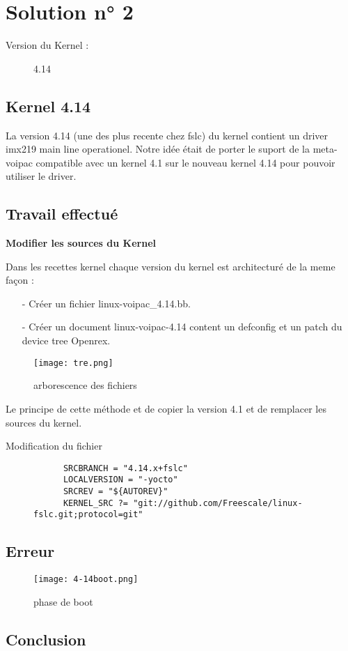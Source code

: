 
\chapter{Solution n° 2} %

\label{Chapter3} %
\begin{description}
  \item[Version du Kernel :] 4.14
\end{description}

\section{Kernel 4.14}
La version 4.14 (une des plus recente chez fslc) du kernel contient un driver imx219
main line operationel. Notre idée était de porter le suport de la meta-voipac compatible
avec un kernel 4.1 sur le nouveau kernel 4.14 pour pouvoir utiliser le driver.

\section{Travail effectué}
\textbf{Modifier les sources du Kernel}

 Dans les recettes kernel chaque version du kernel est architecturé de la meme façon :
  \begin{itemize}
  \item[-] Créer un fichier linux-voipac\_4.14.bb.
  \item[-] Créer un document linux-voipac-4.14 content un defconfig et un patch du device tree Openrex.
  \end{itemize}

\begin{figure}[th]
  \centering
  \texttt{[image: tre.png]}
  \decoRule
  \caption{arborescence des fichiers}  \label{fig:planning}
\end{figure}

Le principe de cette méthode et de copier la version 4.1 et de remplacer les sources du kernel. 

\begin{description}
  \item[Modification du fichier]
    \begin{lstlisting}
      SRCBRANCH = "4.14.x+fslc"
      LOCALVERSION = "-yocto"
      SRCREV = "${AUTOREV}"
      KERNEL_SRC ?= "git://github.com/Freescale/linux-fslc.git;protocol=git"
    \end{lstlisting}
\end{description}

\section{Erreur}

\begin{figure}[th]
  \centering
  \texttt{[image: 4-14boot.png]}
  \decoRule
  \caption{phase de boot}  \label{fig:planning}
\end{figure}

\section{Conclusion}


